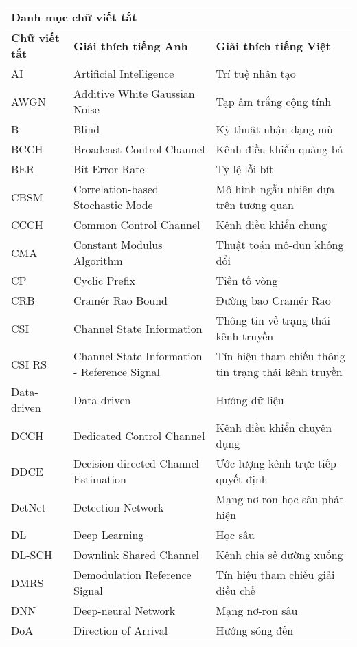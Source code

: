 {\renewcommand{\arraystretch}{1.2}
{\fontsize{12}{13}\selectfont
\begin{longtable}{|p{2.35cm}|>{\raggedright}p{6.2cm}|p{5.75cm}|}
\hline
\multicolumn{3}{|l|}{\textbf{Danh mục chữ viết tắt}} \\ 
\hline
\hline
\textbf{Chữ viết tắt}~ & \textbf{Giải thích tiếng Anh} & \textbf{Giải thích tiếng Việt} \\ 
\hline
AI & Artificial Intelligence & Trí tuệ nhân tạo \\ 
\hline
AWGN & Additive White Gaussian Noise & Tạp âm trắng cộng tính \\ 
\hline
B & Blind & Kỹ thuật nhận dạng mù \\ 
\hline
BCCH & Broadcast Control Channel & Kênh điều khiển quảng bá \\ 
\hline
BER & Bit Error Rate & Tỷ lệ lỗi bít \\ 
\hline
CBSM & Correlation-based Stochastic Mode & Mô hình ngẫu nhiên dựa trên tương quan\\
\hline
CCCH & Common Control Channel & Kênh điều khiển chung \\ 
\hline
CMA & Constant Modulus Algorithm & Thuật toán mô-đun không đổi \\ 
\hline
CP & Cyclic Prefix & Tiền tố vòng \\ 
\hline
CRB & Cramér Rao Bound & Đường bao Cramér Rao \\ 
\hline
CSI & Channel State Information & Thông tin về trạng thái kênh truyền \\ 
\hline
CSI-RS & Channel State Information - Reference Signal & Tín hiệu tham chiếu thông tin trạng thái kênh truyền \\ 
\hline
Data-driven & Data-driven & Hướng dữ liệu \\ 
\hline
DCCH & Dedicated Control Channel & Kênh điều khiển chuyên dụng \\ 
\hline
DDCE & Decision-directed Channel Estimation & Ước lượng kênh trực tiếp quyết định \\ 
\hline
DetNet & Detection Network & Mạng nơ-ron học sâu phát hiện \\ 
\hline
DL & Deep Learning & Học sâu \\ 
\hline
DL-SCH & Downlink Shared Channel & Kênh chia sẻ đường xuống \\ 
\hline
DMRS & Demodulation Reference Signal & Tín hiệu tham chiếu giải điều chế \\ 
\hline
DNN & Deep-neural Network & Mạng nơ-ron sâu \\ 
\hline
DoA & Direction of Arrival & Hướng sóng đến \\ 

\end{longtable}}}
